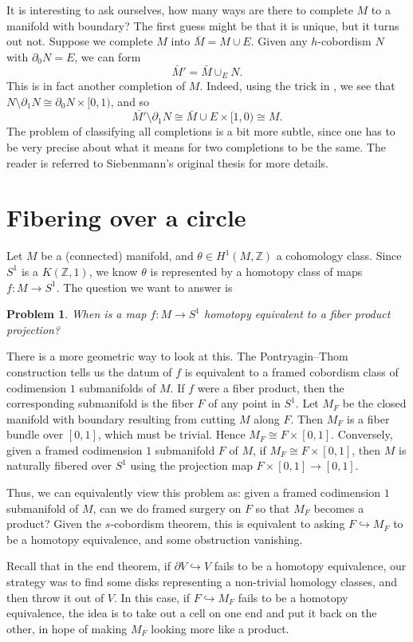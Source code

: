 \documentclass[a4paper, 12pt]{article}
\newtheorem{problem}[thm]{Problem}
\theoremstyle{definition}
\newcommand\Z{\mathbb{Z}}
\begin{document}
It is interesting to ask ourselves, how many ways are there to complete $M$ to a manifold with boundary? The first guess might be that it is unique, but it turns out not. Suppose we complete $M$ into $\bar{M} = M \cup E$. Given any $h$-cobordism $N$ with $\partial_0 N = E$, we can form
\[
  \bar{M}' = \bar{M} \cup_E N.
\]
This is in fact another completion of $M$. Indeed, using the trick in , we see that $N \setminus \partial_1 N \cong \partial_0 N \times [0, 1)$, and so
\[
  \bar{M'} \setminus \partial_1 N \cong \bar{M} \cup E \times [1, 0) \cong M.
\]
The problem of classifying all completions is a bit more subtle, since one has to be very precise about what it means for two completions to be the same. The reader is referred to Siebenmann's original thesis \cite{siebenmann-thesis} for more details.

\section{Fibering over a circle}
Let $M$ be a (connected) manifold, and $\theta \in H^1(M, \Z)$ a cohomology class. Since $S^1$ is a $K(\Z, 1)$, we know $\theta$ is represented by a homotopy class of maps $f: M \to S^1$. The question we want to answer is
\begin{problem}
  When is a map $f: M \to S^1$ homotopy equivalent to a fiber product projection?
\end{problem}

There is a more geometric way to look at this. The Pontryagin--Thom construction tells us the datum of $f$ is equivalent to a framed cobordism class of codimension $1$ submanifolds of $M$. If $f$ were a fiber product, then the corresponding submanifold is the fiber $F$ of any point in $S^1$. Let $M_F$ be the closed manifold with boundary resulting from cutting $M$ along $F$. Then $M_F$ is a fiber bundle over $[0, 1]$, which must be trivial. Hence $M_F \cong F \times [0, 1]$. Conversely, given a framed codimension $1$ submanifold $F$ of $M$, if $M_F \cong F \times [0, 1]$, then $M$ is naturally fibered over $S^1$ using the projection map $F \times [0, 1] \to [0, 1]$.

Thus, we can equivalently view this problem as: given a framed codimension $1$ submanifold of $M$, can we do framed surgery on $F$ so that $M_F$ becomes a product? Given the $s$-cobordism theorem, this is equivalent to asking $F \hookrightarrow M_F$ to be a homotopy equivalence, and some obstruction vanishing.

Recall that in the end theorem, if $\partial V \hookrightarrow V$ fails to be a homotopy equivalence, our strategy was to find some disks representing a non-trivial homology classes, and then throw it out of $V$. In this case, if $F \hookrightarrow M_F$ fails to be a homotopy equivalence, the idea is to take out a cell on one end and put it back on the other, in hope of making $M_F$ looking more like a product.
\end{document}
